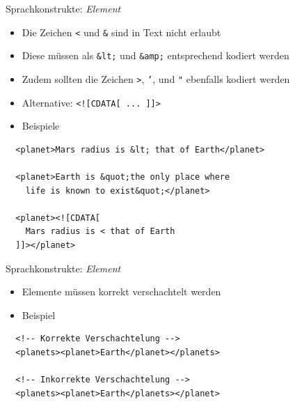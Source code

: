 \documentclass{beamer}
\begin{document}
\begin{frame}[fragile]{Sprachkonstrukte: \emph{Element}}
	
	\begin{itemize}
		\item Die Zeichen \texttt{<} und \texttt{\&} sind in Text nicht erlaubt
		\item Diese müssen als \texttt{\&lt;} und \texttt{\&amp;} entsprechend kodiert werden
		\item Zudem sollten die Zeichen \texttt{>}, \texttt{'}, und \texttt{"} ebenfalls kodiert werden
		\item Alternative: \texttt{<![CDATA[ ... ]]>}
		\item Beispiele
	\end{itemize}
	
	\begin{lstlisting}
  <planet>Mars radius is &lt; that of Earth</planet>
	
  <planet>Earth is &quot;the only place where 
    life is known to exist&quot;</planet>
	  
  <planet><![CDATA[
    Mars radius is < that of Earth
  ]]></planet>
	\end{lstlisting}
	
\end{frame}

\begin{frame}[fragile]{Sprachkonstrukte: \emph{Element}}
	
	\begin{itemize}
		\item Elemente müssen korrekt verschachtelt werden
		\item Beispiel
	\end{itemize}
	
	\begin{lstlisting}
  <!-- Korrekte Verschachtelung -->
  <planets><planet>Earth</planet></planets>
	
  <!-- Inkorrekte Verschachtelung -->
  <planets><planet>Earth</planets></planet>
	\end{lstlisting}
	
\end{frame}
\end{document}
